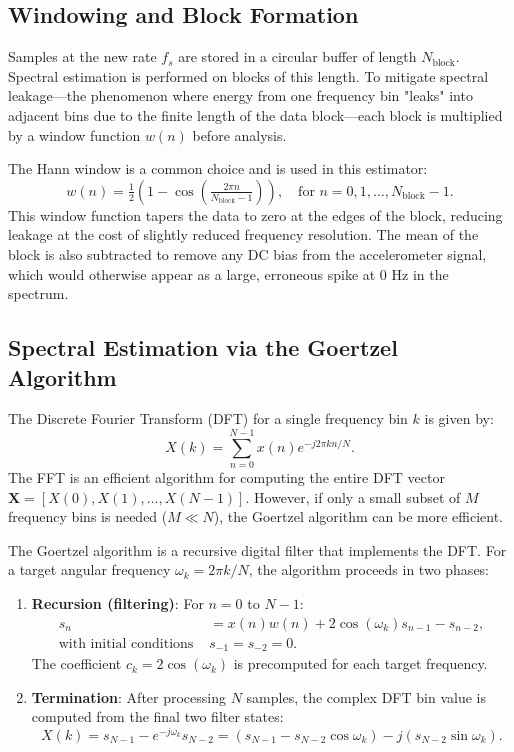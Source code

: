 \documentclass[11pt]{article}
\begin{document}
\subsection{Windowing and Block Formation}
Samples at the new rate $f_s$ are stored in a circular buffer of length $N_\text{block}$. Spectral estimation is performed on blocks of this length. To mitigate spectral leakage—the phenomenon where energy from one frequency bin "leaks" into adjacent bins due to the finite length of the data block—each block is multiplied by a window function $w(n)$ before analysis.

The Hann window is a common choice and is used in this estimator:
\begin{equation}
w(n) = \tfrac{1}{2}\left(1 - \cos\left(\tfrac{2\pi n}{N_\text{block}-1}\right)\right), \quad \text{for } n = 0, 1, \dots, N_\text{block}-1.
\end{equation}
This window function tapers the data to zero at the edges of the block, reducing leakage at the cost of slightly reduced frequency resolution. The mean of the block is also subtracted to remove any DC bias from the accelerometer signal, which would otherwise appear as a large, erroneous spike at 0 Hz in the spectrum.

\subsection{Spectral Estimation via the Goertzel Algorithm}
\label{subsec:goertzel}
The Discrete Fourier Transform (DFT) for a single frequency bin $k$ is given by:
\begin{equation}
X(k) = \sum_{n=0}^{N-1} x(n) e^{-j 2\pi k n / N}.
\end{equation}
The FFT is an efficient algorithm for computing the entire DFT vector $\mathbf{X} = [X(0), X(1), \dots, X(N-1)]$. However, if only a small subset of $M$ frequency bins is needed ($M \ll N$), the Goertzel algorithm can be more efficient.

The Goertzel algorithm is a recursive digital filter that implements the DFT. For a target angular frequency $\omega_k = 2\pi k / N$, the algorithm proceeds in two phases:
\begin{enumerate}
    \item \textbf{Recursion (filtering)}: For $n = 0$ to $N-1$:
    \begin{align}
    s_n &= x(n) w(n) + 2 \cos(\omega_k) s_{n-1} - s_{n-2}, \\
    \text{with initial conditions } & s_{-1} = s_{-2} = 0.
    \end{align}
    The coefficient $c_k = 2\cos(\omega_k)$ is precomputed for each target frequency.
    \item \textbf{Termination}: After processing $N$ samples, the complex DFT bin value is computed from the final two filter states:
    \begin{equation}
    X(k) = s_{N-1} - e^{-j\omega_k} s_{N-2} = (s_{N-1} - s_{N-2}\cos\omega_k) - j (s_{N-2}\sin\omega_k).
    \end{equation}
\end{enumerate}
\end{document}
